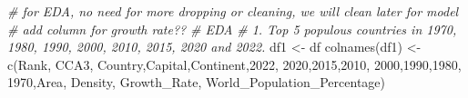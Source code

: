 \documentclass[
]{article}
\newenvironment{Shaded}{\begin{snugshade}}{\end{snugshade}}
\newcommand{\CommentTok}[1]{\textcolor[rgb]{0.56,0.35,0.01}{\textit{#1}}}
\newcommand{\FunctionTok}[1]{\textcolor[rgb]{0.00,0.00,0.00}{#1}}
\newcommand{\NormalTok}[1]{#1}
\newcommand{\OtherTok}[1]{\textcolor[rgb]{0.56,0.35,0.01}{#1}}
\newcommand{\StringTok}[1]{\textcolor[rgb]{0.31,0.60,0.02}{#1}}
\begin{document}
\begin{Shaded}
\begin{Highlighting}[]
\CommentTok{\# for EDA, no need for more dropping or cleaning, we will clean later for model}
\CommentTok{\# add column for growth rate??}
\CommentTok{\# EDA}
\CommentTok{\# 1. Top 5 populous countries in 1970, 1980, 1990, 2000, 2010, 2015, 2020 and 2022.}
\NormalTok{df1 }\OtherTok{\textless{}{-}}\NormalTok{ df}
\FunctionTok{colnames}\NormalTok{(df1) }\OtherTok{\textless{}{-}} \FunctionTok{c}\NormalTok{(}\StringTok{\textquotesingle{}Rank\textquotesingle{}}\NormalTok{, }\StringTok{\textquotesingle{}CCA3\textquotesingle{}}\NormalTok{, }\StringTok{\textquotesingle{}Country\textquotesingle{}}\NormalTok{,}\StringTok{\textquotesingle{}Capital\textquotesingle{}}\NormalTok{,}\StringTok{\textquotesingle{}Continent\textquotesingle{}}\NormalTok{,}\StringTok{\textquotesingle{}2022\textquotesingle{}}\NormalTok{,}
                  \StringTok{\textquotesingle{}2020\textquotesingle{}}\NormalTok{,}\StringTok{\textquotesingle{}2015\textquotesingle{}}\NormalTok{,}\StringTok{\textquotesingle{}2010\textquotesingle{}}\NormalTok{,}
                  \StringTok{\textquotesingle{}2000\textquotesingle{}}\NormalTok{,}\StringTok{\textquotesingle{}1990\textquotesingle{}}\NormalTok{,}\StringTok{\textquotesingle{}1980\textquotesingle{}}\NormalTok{,}
                  \StringTok{\textquotesingle{}1970\textquotesingle{}}\NormalTok{,}\StringTok{\textquotesingle{}Area\textquotesingle{}}\NormalTok{, }\StringTok{\textquotesingle{}Density\textquotesingle{}}\NormalTok{, }\StringTok{\textquotesingle{}Growth\_Rate\textquotesingle{}}\NormalTok{,}
                  \StringTok{\textquotesingle{}World\_Population\_Percentage\textquotesingle{}}\NormalTok{)}


\end{Highlighting}
\end{Shaded}
\end{document}
